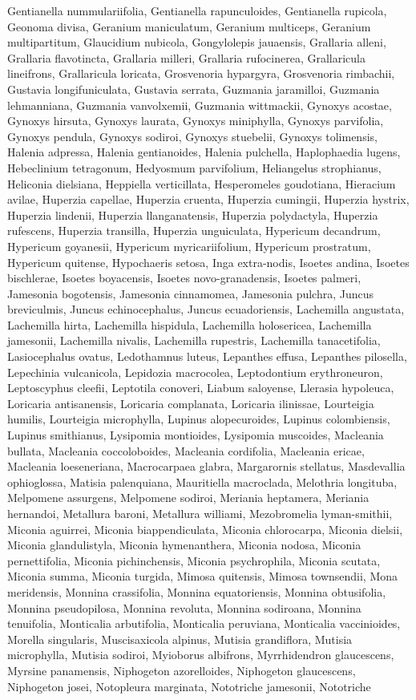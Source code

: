\documentclass[]{article}
\begin{document}
Gentianella nummulariifolia, Gentianella rapunculoides, Gentianella rupicola, Geonoma divisa, Geranium maniculatum, Geranium multiceps, Geranium multipartitum, Glaucidium nubicola, Gongylolepis jauaensis, Grallaria alleni, Grallaria flavotincta, Grallaria milleri, Grallaria rufocinerea, Grallaricula lineifrons, Grallaricula loricata, Grosvenoria hypargyra, Grosvenoria rimbachii, Gustavia longifuniculata, Gustavia serrata, Guzmania jaramilloi, Guzmania lehmanniana, Guzmania vanvolxemii, Guzmania wittmackii, Gynoxys acostae, Gynoxys hirsuta, Gynoxys laurata, Gynoxys miniphylla, Gynoxys parvifolia, Gynoxys pendula, Gynoxys sodiroi, Gynoxys stuebelii, Gynoxys tolimensis, Halenia adpressa, Halenia gentianoides, Halenia pulchella, Haplophaedia lugens, Hebeclinium tetragonum, Hedyosmum parvifolium, Heliangelus strophianus, Heliconia dielsiana, Heppiella verticillata, Hesperomeles goudotiana, Hieracium avilae, Huperzia capellae, Huperzia cruenta, Huperzia cumingii, Huperzia hystrix, Huperzia lindenii, Huperzia llanganatensis, Huperzia polydactyla, Huperzia rufescens, Huperzia transilla, Huperzia unguiculata, Hypericum decandrum, Hypericum goyanesii, Hypericum myricariifolium, Hypericum prostratum, Hypericum quitense, Hypochaeris setosa, Inga extra-nodis, Isoetes andina, Isoetes bischlerae, Isoetes boyacensis, Isoetes novo-granadensis, Isoetes palmeri, Jamesonia bogotensis, Jamesonia cinnamomea, Jamesonia pulchra, Juncus breviculmis, Juncus echinocephalus, Juncus ecuadoriensis, Lachemilla angustata, Lachemilla hirta, Lachemilla hispidula, Lachemilla holosericea, Lachemilla jamesonii, Lachemilla nivalis, Lachemilla rupestris, Lachemilla tanacetifolia, Lasiocephalus ovatus, Ledothamnus luteus, Lepanthes effusa, Lepanthes pilosella, Lepechinia vulcanicola, Lepidozia macrocolea, Leptodontium erythroneuron, Leptoscyphus cleefii, Leptotila conoveri, Liabum saloyense, Llerasia hypoleuca, Loricaria antisanensis, Loricaria complanata, Loricaria ilinissae, Lourteigia humilis, Lourteigia microphylla, Lupinus alopecuroides, Lupinus colombiensis, Lupinus smithianus, Lysipomia montioides, Lysipomia muscoides, Macleania bullata, Macleania coccoloboides, Macleania cordifolia, Macleania ericae, Macleania loeseneriana, Macrocarpaea glabra, Margarornis stellatus, Masdevallia ophioglossa, Matisia palenquiana, Mauritiella macroclada, Melothria longituba, Melpomene assurgens, Melpomene sodiroi, Meriania heptamera, Meriania hernandoi, Metallura baroni, Metallura williami, Mezobromelia lyman-smithii, Miconia aguirrei, Miconia biappendiculata, Miconia chlorocarpa, Miconia dielsii, Miconia glandulistyla, Miconia hymenanthera, Miconia nodosa, Miconia pernettifolia, Miconia pichinchensis, Miconia psychrophila, Miconia scutata, Miconia summa, Miconia turgida, Mimosa quitensis, Mimosa townsendii, Mona meridensis, Monnina crassifolia, Monnina equatoriensis, Monnina obtusifolia, Monnina pseudopilosa, Monnina revoluta, Monnina sodiroana, Monnina tenuifolia, Monticalia arbutifolia, Monticalia peruviana, Monticalia vaccinioides, Morella singularis, Muscisaxicola alpinus, Mutisia grandiflora, Mutisia microphylla, Mutisia sodiroi, Myioborus albifrons, Myrrhidendron glaucescens, Myrsine panamensis, Niphogeton azorelloides, Niphogeton glaucescens, Niphogeton josei, Notopleura marginata, Nototriche jamesonii, Nototriche 
\end{document}
